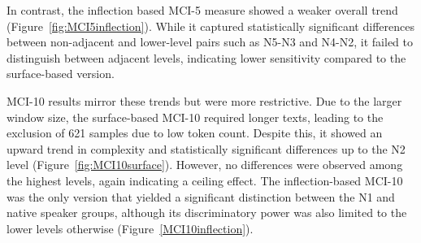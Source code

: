
In contrast, the inflection based MCI-5 measure showed a weaker overall trend (Figure~\ref{fig:MCI5inflection}).
While it captured
statistically
significant differences between non-adjacent and lower-level pairs such as N5-N3 and N4-N2, it failed to distinguish
between adjacent levels, indicating lower sensitivity compared to the surface-based version.



MCI-10 results mirror these trends but were more restrictive. Due to the larger window size, the surface-based MCI-10
required longer texts, leading to the exclusion of 621 samples due to low token count.  Despite this, it showed an
upward trend in complexity and statistically significant differences up to the N2 level (Figure~\ref{fig:MCI10surface}). However, no
differences were
observed among the highest levels, again indicating a ceiling effect. The inflection-based MCI-10 was the only
version that yielded a significant distinction between the N1 and native speaker groups, although its discriminatory
power was also limited to the lower levels otherwise (Figure~\ref{MCI10inflection}).


